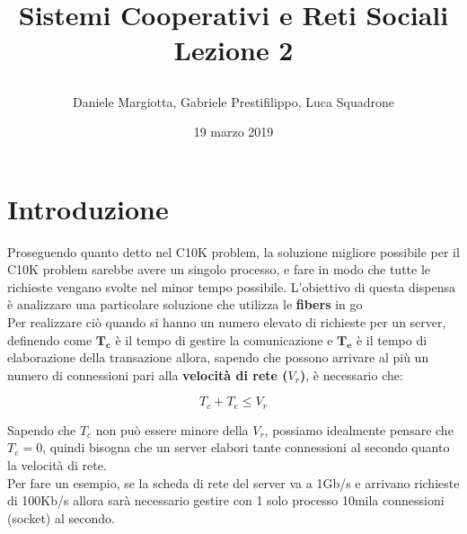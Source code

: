 \documentclass[10pt,a4paper,italian]{report}
\begin{document}
\makeatletter
\let\@orig@endthebibliography\endthebibliography
\renewcommand\endthebibliography{
  \xdef\@kept@last@number{\the\c@enumiv}
  \@orig@endthebibliography}

\newenvironment{thesitography}[1]
  {\def\bibname{Fonti virtuali}
   \thebibliography{#1}
   \setcounter{enumiv}{\@kept@last@number}
}
  {\@orig@endthebibliography}
\makeatother

\title{\begin{center}\textbf{Sistemi Cooperativi e Reti Sociali}\newline
\vspace{0.3cm}\\
Lezione 2
\end{center}}
\author{Daniele Margiotta, Gabriele Prestifilippo, Luca Squadrone}
\date{19 marzo 2019}
\maketitle

\clearpage
\tableofcontents
\newpage

\chapter{Introduzione}
\noindent Proseguendo quanto detto nel C10K problem, la soluzione migliore possibile per il C10K problem sarebbe avere un singolo processo, e fare in modo che tutte le richieste vengano svolte nel minor tempo possibile. L'obiettivo di questa dispensa è analizzare una particolare soluzione che utilizza le \textbf{fibers} in go\\

\noindent Per realizzare ciò quando si hanno un numero elevato di richieste per un server, definendo come $\textbf{T}_\textbf{c}$ è il tempo di gestire la comunicazione e $\textbf{T}_\textbf{e}$ è il tempo di elaborazione della transazione allora, sapendo che possono arrivare al più un numero di connessioni pari alla \textbf{velocità di rete ($V_r$)}, è necessario che:

\begin{equation}
T_c + T_e \leqslant V_r
\end{equation}

\noindent Sapendo che $T_c$ non può essere minore della $V_r$, possiamo idealmente pensare che $T_e=0$, quindi bisogna che un server elabori tante connessioni al secondo quanto la velocità di rete.\\

\noindent Per fare un esempio, se la scheda di rete del server va a 1Gb/s e arrivano richieste di 100Kb/s allora sarà necessario gestire con 1 solo processo 10mila connessioni (socket) al secondo.\\
\end{document}
